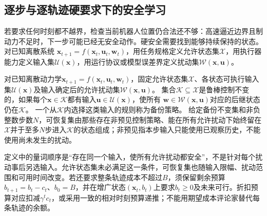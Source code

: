 \subsection{逐步与逐轨迹硬要求下的安全学习}
\label{sec:rl-trustworthy-hard-safety}

若要求任何时刻都不越界，检查当前机器人位置仍合法还不够：高速逼近边界且制动力不足时，下一步可能已经无安全动作。硬安全需要找到能够持续保持的状态。对已知离散系统
$\bm{x}_{t+1}=f(\bm{x}_t,\bm{u}_t,\bm{w}_t)$，用任务规格定义允许状态集$\mathcal X$，用执行器能力定义输入集$\mathcal U(\bm{x})$，用运行协议或模型误差界定义扰动集$\mathcal W(\bm{x},\bm{u})$。

\begin{definition}[控制不变集与可恢复集]
  \label{def:rl-trustworthy-invariance}
  对已知离散动力学$\bm{x}_{t+1}=f(\bm{x}_t,\bm{u}_t,\bm{w}_t)$，固定允许状态集$\mathcal X$、各状态可执行输入集$\mathcal U(\bm{x})$及输入确定后的允许扰动集$\mathcal W(\bm{x},\bm{u})$。
  集合$\mathcal K\subseteq\mathcal X$是鲁棒控制不变的，如果每个$\bm{x}\in\mathcal K$都有输入$\bm{u}\in\mathcal U(\bm{x})$，使所有
  $\bm{w}\in\mathcal W(\bm{x},\bm{u})$对应的后继状态仍在$\mathcal K$。
  一个从$\mathcal K$内选择这类输入的规则称为备份策略。
  给定备份不变集和非负整数步数$N$，可恢复集由那些存在非预见控制策略、能在所有允许扰动下始终留在$\mathcal X$并于至多$N$步进入$\mathcal K$的状态组成；非预见指本步输入只能使用已观察历史，不能使用尚未发生的扰动。
\end{definition}

定义中的量词顺序是“存在同一个输入，使所有允许扰动都安全”，不是针对每个扰动事后另选输入。允许状态集未必满足这一条件，可恢复集也随输入限幅、扰动范围和可用时间改变。若还要求整条轨迹成本不超过$B$，须保留剩余预算
$b_{t+1}=b_t-c_t$、$b_0=B$，并在增广状态$(\bm{x}_t,b_t)$上要求$b_t\geq0$及未来可行。折扣预算对应扣减$\gamma^tc_t$，或采用一致的相对时刻预算递推；不能用期望成本评论家替代每条轨迹的余额。

